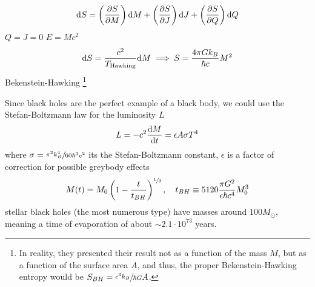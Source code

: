 \begin{equation}
	\text{d} S=\left(\frac{\partial S}{\partial M}\right)\text{d} M+\left(\frac{\partial S}{\partial J}\right)\text{d} J+\left(\frac{\partial S}{\partial Q}\right)\text{d} Q
\end{equation}
$Q=J=0$ $E=Mc^2$
\begin{equation}
	\text{d} S=\frac{c^2}{T_{\text{Hawking}}}\text{d} M\implies S=\frac{4\pi Gk_B}{\hbar c}M^2
\end{equation}
Bekenstein-Hawking \footnote{In reality, they presented their result not as a function of the mass $M$, but as a function of the surface area $A$, and thus, the proper Bekenstein-Hawking entropy would be $S_{BH}=\sfrac{c^3k_B}{\hbar G}A$.}

Since black holes are the perfect example of a black body, we could use the Stefan-Boltzmann law for the luminosity $L$
\begin{equation}
	L=-c^2\frac{\text{d} M}{\text{d} t}=\epsilon A \sigma T^4
\end{equation}
where $\sigma=\sfrac{\pi^2 k_B^4}{60\hbar^3c^2}$ its the Stefan-Boltzmann constant, $\epsilon$ is a factor of correction for possible greybody effects
\begin{equation}
	M(t)=M_0\left(1-\frac{t}{t_{BH}}\right)^{\sfrac{1}{3}},\quad t_{BH}\equiv 5120\frac{\pi G^2}{\epsilon\hbar c^4}M_0^3
\end{equation}
stellar black holes (the most numerous type) have masses around $100M_\odot$, meaning a time of evaporation of about $\sim 2.1\cdot10^{73}$ years.
